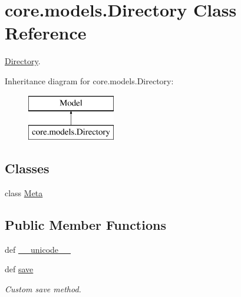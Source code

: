 \hypertarget{classcore_1_1models_1_1Directory}{\section{core.\-models.\-Directory Class Reference}
\label{classcore_1_1models_1_1Directory}
}


\hyperlink{classcore_1_1models_1_1Directory}{Directory}.  


Inheritance diagram for core.\-models.\-Directory\-:\begin{figure}[H]
\begin{center}
\leavevmode
\includegraphics[height=2.000000cm]{classcore_1_1models_1_1Directory}
\end{center}
\end{figure}
\subsection*{Classes}
\begin{DoxyCompactItemize}
\item 
class \hyperlink{classcore_1_1models_1_1Directory_1_1Meta}{Meta}
\end{DoxyCompactItemize}
\subsection*{Public Member Functions}
\begin{DoxyCompactItemize}
\item 
def \hyperlink{classcore_1_1models_1_1Directory_a9ed85c6776b6e77c5b9f42a49f90a6af}{\-\_\-\-\_\-unicode\-\_\-\-\_\-}
\item 
def \hyperlink{classcore_1_1models_1_1Directory_a7c6d03d3fe7f4854dcda4559fc99815a}{save}
\begin{DoxyCompactList}\small\item\em Custom save method. \end{DoxyCompactList}\end{DoxyCompactItemize}
